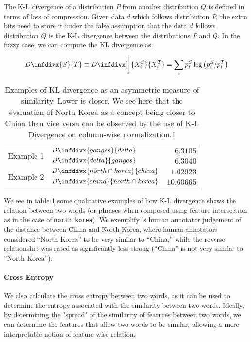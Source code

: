\documentclass[11pt,a4paper]{article}
\newcommand{\infdiv}{D\infdivx}
\begin{document}
The K-L divergence of a distribution $P$ from another distribution $Q$ is defined in terms of loss of compression. Given data $d$ which follows distribution $P$, the extra bits need to store it under the false assumption that the data $d$ follows distribution $Q$ is the K-L divergence between the distributions $P$ and $Q$. In the fuzzy case, we can compute the KL divergence as:

{\footnotesize
\begin{equation*}
     \infdiv{S}{T} \equiv \infdiv[\bigg]{X^S_i}{X^T_i} =  \sum_i p^S_i \log \left( p^S_i / p^T_i \right) 
\end{equation*}
}

\begin{table}[]
    \centering
    {\small
    \begin{tabular}{clr}
        \multirow{2}{*}{Example 1} & $\infdiv{ganges}{delta}$ & $6.3105$  \\
                                   & $\infdiv{delta}{ganges}$ & $6.3040$  \\
        \multirow{2}{*}{Example 2} & $\infdiv{north \cap korea}{china}$ & $1.02923$ \\
                                   & $\infdiv{china}{north \cap korea}$ & $10.60665$
    \end{tabular}
    }
    \caption{Examples of KL-divergence as an asymmetric measure of similarity. Lower is closer. We see here that the evaluation of North Korea as a concept being closer to China than vice versa can be observed by the use of K-L Divergence on column-wise normalization.1}
    \label{tab: k-l divergence}
\end{table}

We see in table \ref{tab: k-l divergence} some qualitative examples of how K-L divergence shows the relation between two words (or phrases when composed using feature intersection as in the case of \texttt{north korea}). We exemplify \citet{nematzadeh2017evaluating}'s human annotator judgement of the distance between China and North Korea, where human annotators considered “North Korea” to be very similar to “China,” while the reverse relationship was rated as significantly less strong (“China” is not very similar to ”North Korea”).

\paragraph{Cross Entropy} We also calculate the cross entropy between two words, as it can be used to determine the entropy associated with the similarity between two words. Ideally, by determining the "spread" of the similarity of features between two words, we can determine the features that allow two words to be similar, allowing a more interpretable notion of feature-wise relation. 
\end{document}
